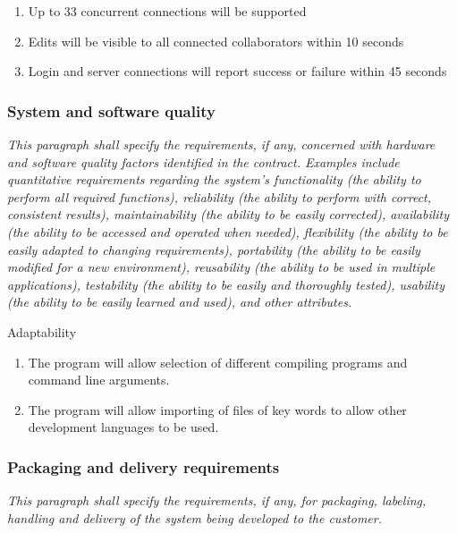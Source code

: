 \documentclass[twoside,letterpaper]{article}
\begin{document}
\begin{enumerate}
  \item Up to 33 concurrent connections will be supported
  \item Edits will be visible to all connected collaborators within 10 seconds
  \item Login and server connections will report success or failure within 45 seconds
\end{enumerate}

\subsubsection[System and software quality]{\rmfamily\bfseries System and software
quality}
\hypertarget{RefHeading19059017292}{}{\itshape
This paragraph shall specify the requirements, if any, concerned
with hardware and software quality factors identified in the contract.
Examples include quantitative requirements regarding the system's
functionality (the ability to perform all required functions),
reliability (the ability to perform with correct, consistent
results), maintainability (the ability to be easily corrected),
availability (the ability to be accessed and operated when needed),
flexibility (the ability to be easily adapted to changing requirements),
portability (the ability to be easily modified for a new environment),
reusability (the ability to be used in multiple applications),
testability (the ability to be easily and thoroughly tested),
usability (the ability to be easily learned and used), and other attributes.}

Adaptability
\begin{enumerate}
  \item The program will allow selection of different compiling programs and command line arguments.
  \item The program will allow importing of files of key words to allow other development languages to be used.
\end{enumerate}

\subsubsection[Packaging and delivery requirements]{\rmfamily\bfseries
Packaging and delivery requirements}
\hypertarget{RefHeading19259017292}{}{\itshape
This paragraph shall specify the requirements, if any, for packaging,
labeling, handling and delivery of the system
being developed to the customer.}
\end{document}
